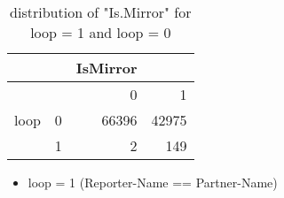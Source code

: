 \documentclass{article}
\begin{document}






\begin{table}[ht]
\centering
\begin{tabular}{rrrr}
& & IsMirror \\
  \hline
 & & 0 & 1 \\ 
  \hline
loop & 0 & 66396 & 42975 \\ 
     & 1 &   2 & 149 \\ 
   \hline
\end{tabular}
\caption{distribution of "Is.Mirror" for loop = 1 and loop = 0}
\end{table}

\begin{itemize}
\item loop = 1 (Reporter-Name == Partner-Name)

\end{itemize}
\end{document}
